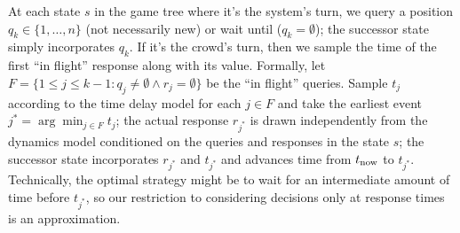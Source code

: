 At each state $s$ in the game tree where it's the system's turn,
we query a position $q_k \in \{1, \dots, n\}$ (not necessarily new)
or wait until ($q_k = \emptyset$);
the successor state simply incorporates $q_k$.
If it's the crowd's turn,
then we sample the time of the first ``in flight'' response along with its value.
Formally, let $F = \{ 1 \le j \le k-1 : q_j \neq \emptyset \wedge r_j = \emptyset \}$ be the ``in flight'' queries.
Sample $t_j$ according to the time delay model for each $j \in F$
and take the earliest event $j^* = \arg\min_{j \in F} t_j$;
the actual response $r_{j^*}$ is drawn independently from the dynamics model conditioned on the queries and responses
in the state $s$;
the successor state incorporates $r_{j^*}$ and $t_{j^*}$ and advances time from $t_\text{now}$ to $t_{j^*}$.
Technically, the optimal strategy might be to wait for an intermediate amount of time before $t_{j^*}$,
so our restriction to considering decisions only at response times is an approximation.





